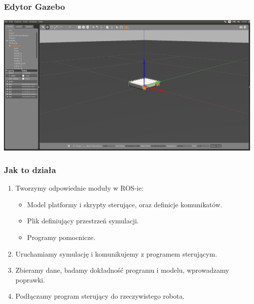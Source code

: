 \documentclass{beamer}
\begin{document}
	\begin{frame}
		\frametitle{Edytor Gazebo}
		\includegraphics[width=\textwidth]{graphics/editor.png}
	\end{frame}

	\begin{frame}
		\frametitle{Jak to działa}
		\begin{enumerate}
			\item Tworzymy odpowiednie moduły w ROS-ie:
			\begin{itemize}
			 \item Model platformy i skrypty sterujące, oraz definicje komunikatów.
			 \item Plik definiujący przestrzeń symulacji.
			 \item Programy pomocnicze.
			\end{itemize}
			\item Uruchamiamy symulację i komunikujemy z programem sterującym.
			\item Zbieramy dane, badamy dokładność programu i modelu, wprowadzamy poprawki.
			\item Podłączamy program sterujący do rzeczywistego robota.
		\end{enumerate}
	\end{frame}
	
\end{document}
